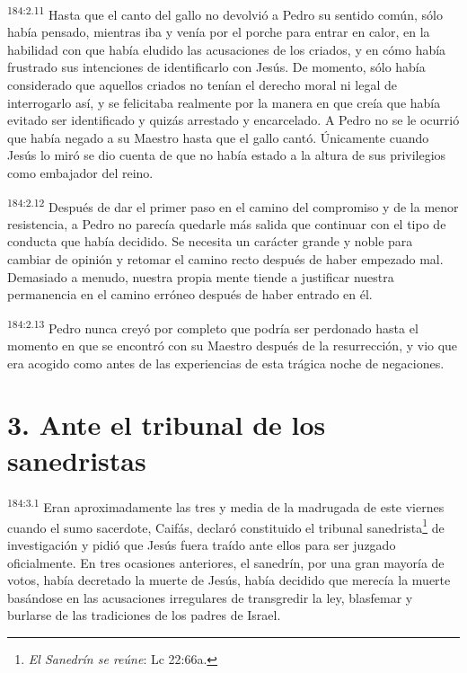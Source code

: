 \par 
\textsuperscript{184:2.11} Hasta que el canto del gallo no devolvió a Pedro su sentido común, sólo había pensado, mientras iba y venía por el porche para entrar en calor, en la habilidad con que había eludido las acusaciones de los criados, y en cómo había frustrado sus intenciones de identificarlo con Jesús. De momento, sólo había considerado que aquellos criados no tenían el derecho moral ni legal de interrogarlo así, y se felicitaba realmente por la manera en que creía que había evitado ser identificado y quizás arrestado y encarcelado. A Pedro no se le ocurrió que había negado a su Maestro hasta que el gallo cantó. Únicamente cuando Jesús lo miró se dio cuenta de que no había estado a la altura de sus privilegios como embajador del reino.

\par 
\textsuperscript{184:2.12} Después de dar el primer paso en el camino del compromiso y de la menor resistencia, a Pedro no parecía quedarle más salida que continuar con el tipo de conducta que había decidido. Se necesita un carácter grande y noble para cambiar de opinión y retomar el camino recto después de haber empezado mal. Demasiado a menudo, nuestra propia mente tiende a justificar nuestra permanencia en el camino erróneo después de haber entrado en él.

\par 
\textsuperscript{184:2.13} Pedro nunca creyó por completo que podría ser perdonado hasta el momento en que se encontró con su Maestro después de la resurrección, y vio que era acogido como antes de las experiencias de esta trágica noche de negaciones.

\section*{3. Ante el tribunal de los sanedristas}
\par 
\textsuperscript{184:3.1} Eran aproximadamente las tres y media de la madrugada de este viernes cuando el sumo sacerdote, Caifás, declaró constituido el tribunal sanedrista\footnote{\textit{El Sanedrín se reúne}: Lc 22:66a.} de investigación y pidió que Jesús fuera traído ante ellos para ser juzgado oficialmente. En tres ocasiones anteriores, el sanedrín, por una gran mayoría de votos, había decretado la muerte de Jesús, había decidido que merecía la muerte basándose en las acusaciones irregulares de transgredir la ley, blasfemar y burlarse de las tradiciones de los padres de Israel.


